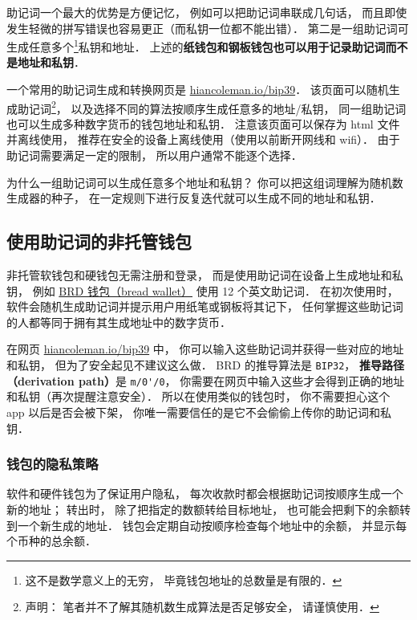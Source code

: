 助记词一个最大的优势是方便记忆， 例如可以把助记词串联成几句话， 而且即使发生轻微的拼写错误也容易更正（而私钥一位都不能出错）． 第二是一组助记词可生成任意多个\footnote{这不是数学意义上的无穷， 毕竟钱包地址的总数量是有限的．}私钥和地址． 上述的\textbf{纸钱包和钢板钱包也可以用于记录助记词而不是地址和私钥}．

一个常用的助记词生成和转换网页是 \href{https://iancoleman.io/bip39/}{hiancoleman.io/bip39}． 该页面可以随机生成助记词\footnote{声明： 笔者并不了解其随机数生成算法是否足够安全， 请谨慎使用．}， 以及选择不同的算法按顺序生成任意多的地址/私钥， 同一组助记词也可以生成多种数字货币的钱包地址和私钥． 注意该页面可以保存为 html 文件并离线使用， 推荐在安全的设备上离线使用（使用以前断开网线和 wifi）． 由于助记词需要满足一定的限制， 所以用户通常不能逐个选择．

为什么一组助记词可以生成任意多个地址和私钥？ 你可以把这组词理解为随机数生成器的种子， 在一定规则下进行反复迭代就可以生成不同的地址和私钥．

\subsection{使用助记词的非托管钱包}
非托管软钱包和硬钱包无需注册和登录， 而是使用助记词在设备上生成地址和私钥， 例如 \href{https://brd.com/}{BRD 钱包（bread wallet）} 使用 12 个英文助记词． 在初次使用时， 软件会随机生成助记词并提示用户用纸笔或钢板将其记下， 任何掌握这些助记词的人都等同于拥有其生成地址中的数字货币．

在网页 \href{https://iancoleman.io/bip39/}{hiancoleman.io/bip39} 中， 你可以输入这些助记词并获得一些对应的地址和私钥， 但为了安全起见不建议这么做． BRD 的推导算法是 \verb|BIP32|， \textbf{推导路径（derivation path）}是 \verb|m/0'/0|， 你需要在网页中输入这些才会得到正确的地址和私钥（再次提醒注意安全）． 所以在使用类似的钱包时， 你不需要担心这个 app 以后是否会被下架， 你唯一需要信任的是它不会偷偷上传你的助记词和私钥．

\subsubsection{钱包的隐私策略}
软件和硬件钱包为了保证用户隐私， 每次收款时都会根据助记词按顺序生成一个新的地址； 转出时， 除了把指定的数额转给目标地址， 也可能会把剩下的余额转到一个新生成的地址． 钱包会定期自动按顺序检查每个地址中的余额， 并显示每个币种的总余额．
